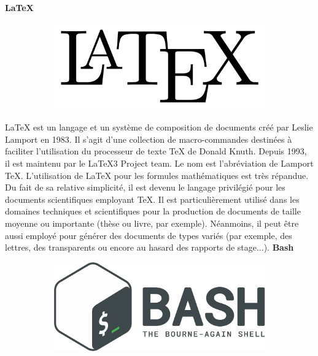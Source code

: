 \documentclass{article}
\begin{document}
\textbf{LaTeX}
\newline
\begin{figure}[h!]
	\centering
  	\begin{subfigure}[b]{0.25\linewidth}
	\includegraphics[width=\linewidth]{LaTeX.png}
  	\end{subfigure}
\end{figure}

LaTeX est un langage et un système de composition de documents créé par Leslie Lamport en 1983. Il s'agit d'une collection de macro-commandes destinées à faciliter l'utilisation du processeur de texte TeX de Donald Knuth. Depuis 1993, il est maintenu par le LaTeX3 Project team. Le nom est l'abréviation de Lamport TeX. L'utilisation de LaTeX pour les formules mathématiques est très répandue.
\newline
Du fait de sa relative simplicité, il est devenu le langage privilégié pour les documents scientifiques employant TeX. Il est particulièrement utilisé dans les domaines techniques et scientifiques pour la production de documents de taille moyenne ou importante (thèse ou livre, par exemple). Néanmoins, il peut être aussi employé pour générer des documents de types variés (par exemple, des lettres, des transparents ou encore au hasard des rapports de stage...).
\newpage
\textbf{Bash}
\newline
\begin{figure}[h!]
	\centering
  	\begin{subfigure}[b]{0.25\linewidth}
	\includegraphics[width=\linewidth]{bash.png}
  	\end{subfigure}
\end{figure}
\end{document}
